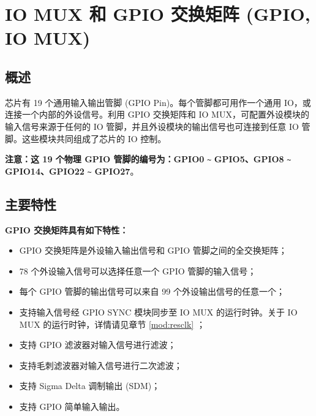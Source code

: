 \documentclass[main\_\_CN.tex]{subfiles}
\begin{document}

\ifglobal
\else
    {\let\clearpage\relax \listoftodos}
    {\let\clearpage\relax \listofdonetodos}
    \tableofcontents
    \listoftables
    \listoffigures
\fi


\hypertarget{iomuxgpio}{}
\chapter{IO MUX 和 GPIO 交换矩阵 (GPIO, IO MUX)}
\label{mod:iomuxgpio}

\section{概述}

\chipname{} 芯片有 19 个通用输入输出管脚 (GPIO Pin)。每个管脚都可用作一个通用 IO，或连接一个内部的外设信号。利用 GPIO 交换矩阵和 IO MUX，可配置外设模块的输入信号来源于任何的 IO 管脚，并且外设模块的输出信号也可连接到任意 IO 管脚。这些模块共同组成了芯片的 IO 控制。

\textbf{注意：这 19 个物理 GPIO 管脚的编号为：GPIO0} \verb+~+ \textbf{GPIO5、GPIO8} \verb+~+ \textbf{GPIO14、GPIO22} \verb+~+ \textbf{GPIO27}。


\section{主要特性}

\textbf{GPIO 交换矩阵具有如下特性：}

\begin{itemize}
\item GPIO 交换矩阵是外设输入输出信号和 GPIO 管脚之间的全交换矩阵；
\item 78 个外设输入信号可以选择任意一个 GPIO 管脚的输入信号；
\item 每个 GPIO 管脚的输出信号可以来自 99 个外设输出信号的任意一个；

\item 支持输入信号经 GPIO SYNC 模块同步至 IO MUX 的运行时钟。关于 IO MUX 的运行时钟，详情请见章节 \ref{mod:resclk} \textit{}；

\item 支持 GPIO 滤波器对输入信号进行滤波；
\item 支持毛刺滤波器对输入信号进行二次滤波；
\item 支持 Sigma Delta 调制输出 (SDM)；
\item 支持 GPIO 简单输入输出。
\end{itemize}
\end{document}

